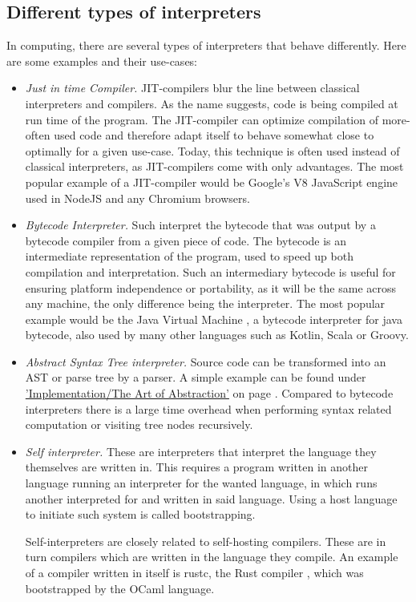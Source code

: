 \documentclass[12pt,a4paper]{report}
\newcommand{\cte}[1] {
    \cite{#1}
}
\begin{document}
\subsection{Different types of interpreters}
In computing, there are several types of interpreters that behave differently.
Here are some examples and their use-cases:
\begin{itemize}
    \item \emph{Just in time Compiler.} JIT-compilers blur the line between
        classical interpreters and compilers. As the name suggests, code is
        being compiled at run time of the program. The JIT-compiler can optimize
        compilation of more-often used code and therefore adapt itself to
        behave somewhat close to optimally for a given use-case. Today, this 
        technique is often used instead of classical interpreters, as
        JIT-compilers come with only advantages. The most popular example of
        a JIT-compiler would be Google's V8\cte{V8} JavaScript engine used
        in NodeJS and any Chromium browsers.
    \item \emph{Bytecode Interpreter.} Such interpret the bytecode that was
        output by a bytecode compiler from a given piece of code. The bytecode
        is an intermediate representation of the program, used to speed up
        both compilation and interpretation. Such an intermediary bytecode is
        useful for ensuring platform independence or portability, as it will be
        the same across any machine, the only difference being the interpreter.
        The most popular example would be the Java Virtual Machine\cte{jvm},
        a bytecode interpreter for java bytecode, also used by many other languages
        such as Kotlin, Scala or Groovy.
    \item \emph{Abstract Syntax Tree interpreter.} Source code can be
        transformed into an AST or parse tree by a parser. A simple example
        can be found under 
        \hyperref[simple interpreter]{'Implementation/The Art of Abstraction'}
        on page \pageref{simple interpreter}. Compared to bytecode interpreters
        there is a large time overhead when performing syntax related computation
        or visiting tree nodes recursively.
    \item \emph{Self interpreter.} These are interpreters that interpret the
        language they themselves are written in. This requires a program
        written in another language running an interpreter for the wanted
        language, in which runs another interpreted for and written in said
        language. Using a host language to initiate such system is called
        bootstrapping.

        Self-interpreters are closely related to self-hosting compilers. These
        are in turn compilers which are written in the language they compile.
        An example of a compiler written in itself is rustc, the Rust
        compiler\cte{rustc}, which was bootstrapped by the OCaml language.
\end{itemize}
\end{document}
